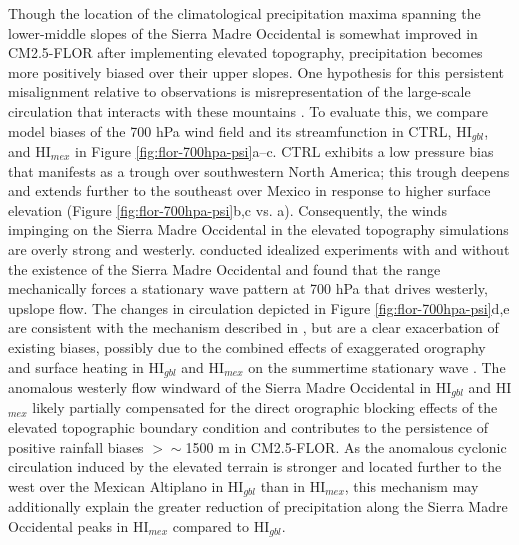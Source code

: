 \documentclass[draft]{agujournal2019}
\begin{document}
Though the location of the climatological precipitation maxima spanning the lower-middle slopes of the Sierra Madre Occidental is somewhat improved in CM2.5-FLOR after implementing elevated topography, precipitation becomes more positively biased over their upper slopes. One hypothesis for this persistent misalignment relative to observations is misrepresentation of the large-scale circulation that interacts with these mountains \cite{berbery01jc,boos21n}. To evaluate this, we compare model biases of the 700 hPa wind field and its streamfunction in CTRL, HI$_{gbl}$, and HI$_{mex}$ in Figure \ref{fig:flor-700hpa-psi}a--c. CTRL exhibits a low pressure bias that manifests as a trough over southwestern North America; this trough deepens and extends further to the southeast over Mexico in response to higher surface elevation (Figure \ref{fig:flor-700hpa-psi}b,c vs. a). Consequently, the winds impinging on the Sierra Madre Occidental in the elevated topography simulations are overly strong and westerly.  conducted idealized experiments with and without the existence of the Sierra Madre Occidental and found that the range mechanically forces a stationary wave pattern at 700 hPa that drives westerly, upslope flow. The changes in circulation depicted in Figure \ref{fig:flor-700hpa-psi}d,e are consistent with the mechanism described in , but are a clear exacerbation of existing biases, possibly due to the combined effects of exaggerated orography and surface heating in HI$_{gbl}$ and HI$_{mex}$ on the summertime stationary wave \cite{ringler99jas}. The anomalous westerly flow windward of the Sierra Madre Occidental in HI$_{gbl}$ and HI$_{mex}$ likely partially compensated for the direct orographic blocking effects of the elevated topographic boundary condition and contributes to the persistence of positive rainfall biases $>\sim$1500 m in CM2.5-FLOR. As the anomalous cyclonic circulation induced by the elevated terrain is stronger and located further to the west over the Mexican Altiplano in HI$_{gbl}$ than in HI$_{mex}$, this mechanism may additionally explain the greater reduction of precipitation along the Sierra Madre Occidental peaks in HI$_{mex}$ compared to HI$_{gbl}$. 


\end{document}
